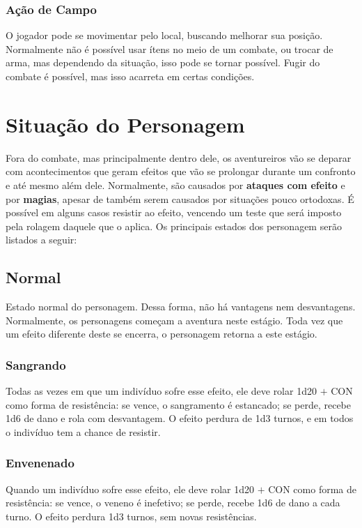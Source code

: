 \documentclass[10pt,twoside,twocolumn]{book}
\begin{document}
\subsubsection*{Ação de Campo}
O jogador pode se movimentar pelo local, buscando melhorar sua posição. Normalmente não é possível usar ítens no meio de um combate, ou trocar de arma, mas dependendo da situação, isso pode se tornar possível. Fugir do combate é possível, mas isso acarreta em certas condições.

\section{Situação do Personagem}
Fora do combate, mas principalmente dentro dele, os aventureiros vão se deparar com acontecimentos que geram efeitos que vão se prolongar durante um confronto e até mesmo além dele. Normalmente, são causados por \textbf{ataques com efeito} e por \textbf{magias}, apesar de também serem causados por situações pouco ortodoxas. É possível em alguns casos resistir ao efeito, vencendo um teste que será imposto pela rolagem daquele que o aplica. Os principais estados dos personagem serão listados a seguir:

\subsection*{Normal}
Estado normal do personagem. Dessa forma, não há vantagens nem desvantagens. Normalmente, os personagens começam a aventura neste estágio. Toda vez que um efeito diferente deste se encerra, o personagem retorna a este estágio.

\subsubsection*{Sangrando}
Todas as vezes em que um indivíduo sofre esse efeito, ele deve rolar 1d20 $+$ CON como forma de resistência: se vence, o sangramento é estancado; se perde, recebe 1d6 de dano e rola com desvantagem. O efeito perdura de 1d3 turnos, e em todos o indivíduo tem a chance de resistir. 

\subsubsection*{Envenenado}
Quando um indivíduo sofre esse efeito, ele deve rolar 1d20 $+$ CON como forma de resistência: se vence, o veneno é inefetivo; se perde, recebe 1d6 de dano a cada turno. O efeito perdura 1d3 turnos, sem novas resistências.
\end{document}
